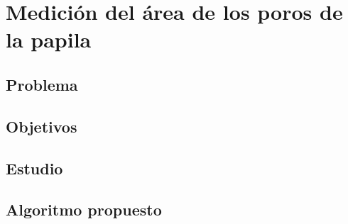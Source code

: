 \chapter{Medición del área de los poros de la papila}
\section{Problema}
\section{Objetivos}
\section{Estudio}
\section{Algoritmo propuesto}
